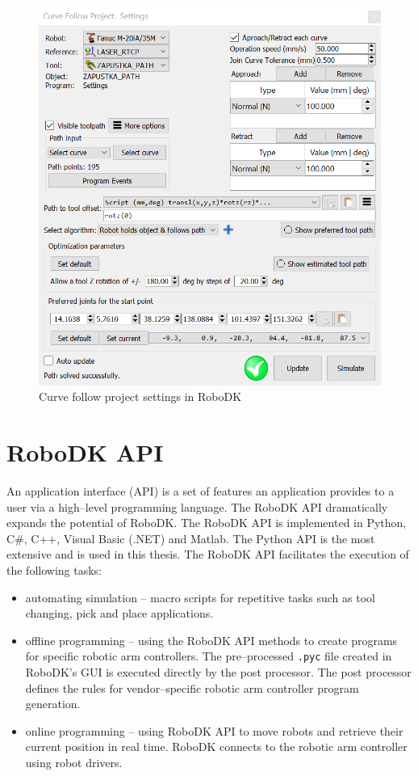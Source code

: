 \begin{figure}[h]
    \centering
    \includegraphics[width=0.9\linewidth]{img/curve_follow_settings.PNG}
    \caption{Curve follow project settings in RoboDK}
    \label{fig:curvefollow}
\end{figure}

\section{RoboDK API}

An application interface (API) is a set of features an application provides to a user via a high--level programming language. The RoboDK API dramatically expands the potential of RoboDK. The RoboDK API is implemented in Python, C\#, C++, Visual Basic (.NET) and Matlab.  The Python API is the most extensive and is used in this thesis. The RoboDK API facilitates the execution of the following tasks:

\begin{itemize}
    
 \item automating simulation -- macro scripts for repetitive tasks such as tool changing, pick and place applications.

 \item offline programming -- using the RoboDK API methods to create programs for specific robotic arm controllers. The pre--processed \texttt{.pyc} file created in RoboDK's GUI is executed directly by the post processor. The post processor defines the rules for vendor--specific robotic arm controller program generation. 

 \item online programming -- using RoboDK API to move robots and retrieve their current position in real time. RoboDK connects to the robotic arm controller using robot drivers.

\end{itemize}

